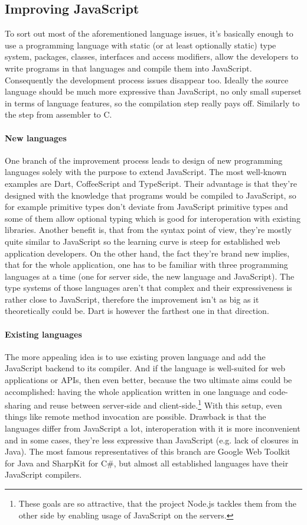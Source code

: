 \documentclass[12pt,a4paper]{report}
\begin{document}
\subsection{Improving JavaScript}

To sort out most of the aforementioned language issues, it's basically enough to use a programming language with static (or at least optionally static) type system, packages, classes, interfaces and access modifiers, allow the developers to write programs in that languages and compile them into JavaScript. Consequently the development process issues disappear too. Ideally the source language should be much more expressive than JavaScript, no only small superset in terms of language features, so the compilation step really pays off. Similarly to the step from assembler to C. 

\paragraph{New languages} One branch of the improvement process leads to design of new programming languages solely with the purpose to extend JavaScript. The most well-known examples are Dart, CoffeeScript and TypeScript. Their advantage is that they're designed with the knowledge that programs would be compiled to JavaScript, so for example primitive types don't deviate from JavaScript primitive types and some of them allow optional typing which is good for interoperation with existing libraries. Another benefit is, that from the syntax point of view, they're mostly quite similar to JavaScript so the learning curve is steep for established web application developers. On the other hand, the fact they're brand new implies, that for the whole application, one has to be familiar with three programming languages at a time (one for server side, the new language and JavaScript). The type systems of those languages aren't that complex and their expressiveness is rather close to JavaScript, therefore the improvement isn't as big as it theoretically could be. Dart is however the farthest one in that direction.

\paragraph{Existing languages} The more appealing idea is to use existing proven language and add the JavaScript backend to its compiler. And if the language is well-suited for web applications or APIs, then even better, because the two ultimate aims could be accomplished: having the whole application written in one language and code-sharing and reuse between server-side and client-side.\footnote{These goals are so attractive, that the project Node.js tackles them from the other side by enabling usage of JavaScript on the servers.} With this setup, even things like remote method invocation are possible. Drawback is that the languages differ from JavaScript a lot, interoperation with it is more inconvenient and in some cases, they're less expressive than JavaScript (e.g. lack of closures in Java). The most famous representatives of this branch are Google Web Toolkit for Java and SharpKit for C\#, but almost all established languages have their JavaScript compilers.
\end{document}
